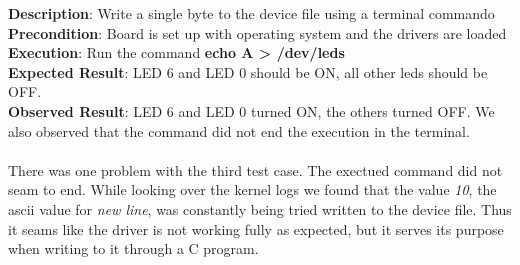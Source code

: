 {\bf Description}: Write a single byte to the device file using a terminal commando\\
{\bf Precondition}: Board is set up with operating system and the drivers are loaded\\
{\bf Execution}: Run the command {\bf echo A > /dev/leds} \\
{\bf Expected Result}: LED 6 and LED 0 should be ON, all other leds should be OFF.\\
{\bf Observed Result}: LED 6 and LED 0 turned ON, the others turned OFF. We also
observed that the command did not end the execution in the terminal.\\
 \\
There was one problem with the third test case. The exectued command did not seam to end.
While looking over the kernel logs we found that the value {\it 10}, the ascii value for
{\it new line}, was constantly being tried written to the device file. Thus it seams like
the driver is not working fully as expected, but it serves its purpose when writing to it 
through a C program.